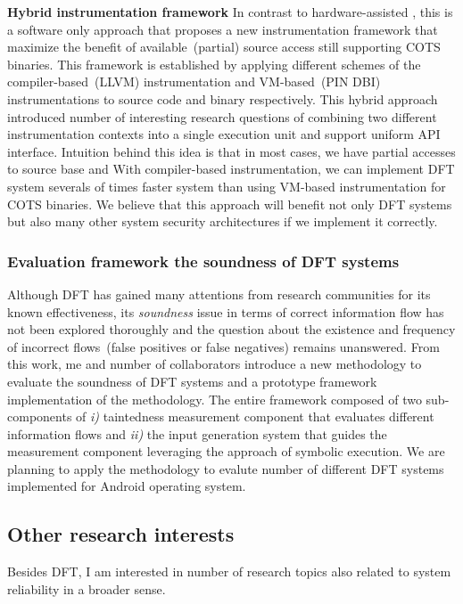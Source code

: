 \documentclass[letterpaper, 10pt]{article}
\begin{document}
\begin{small}
{\bf Hybrid instrumentation framework} In contrast to hardware-assisted \SR,
this is a software only approach that proposes a new instrumentation framework
that maximize the benefit of available~(partial) source access still supporting
COTS binaries.
%
This framework is established by applying different schemes of the
compiler-based~(LLVM) instrumentation and VM-based~(PIN DBI) instrumentations
to source code and binary respectively.
%
This hybrid approach introduced number of interesting research questions of
combining two different instrumentation contexts into a single execution unit
and support uniform API interface.
%
Intuition behind this idea is that in most cases, we have partial accesses to
source base and With compiler-based instrumentation, we can implement DFT
system severals of times faster system than using VM-based instrumentation for
COTS binaries.
%
We believe that this approach will benefit not only DFT systems but also many
other system security architectures if we implement it correctly.

\subsubsection*{Evaluation framework the soundness of DFT systems}
%
Although DFT has gained many attentions from research communities for its known
effectiveness, its {\it soundness} issue in terms of correct information flow
has not been explored thoroughly and the question about the existence and
frequency of incorrect flows~(false positives or false negatives) remains
unanswered. From this work, me and number of collaborators introduce a new
methodology to evaluate the soundness of DFT systems and a prototype framework
implementation of the methodology.
%
The entire framework composed of two sub-components of {\it i)} taintedness
measurement component that evaluates different information flows and {\it ii)}
the input generation system that guides the measurement component leveraging
the approach of symbolic execution. 
%
We are planning to apply the methodology to evalute number of different DFT
systems implemented for Android operating system.

\subsection*{Other research interests}
%
Besides DFT, I am interested in number of research topics also related to
system reliability in a broader sense.


\end{small}
\end{document}
